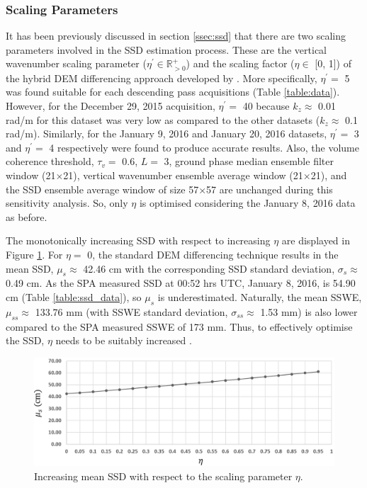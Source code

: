 \documentclass[12pt]{elsarticle}
\numberwithin{equation}{section}
\numberwithin{figure}{section}
\numberwithin{table}{section}
\begin{document}
\subsubsection{Scaling Parameters}
\label{sssec:scale}
It has been previously discussed in section \ref{ssec:ssd} that there are two scaling parameters involved in the SSD estimation process. These are the vertical wavenumber scaling parameter ($\eta^\prime\in\mathbb{R}_{>0}^+$) and the scaling factor ($\eta\in$ [0, 1]) of the hybrid DEM differencing approach developed by \cite{Cloude2010}. More specifically, $\eta^\prime =$ 5 was found suitable for each descending pass acquisitions (Table \ref{table:data}). However, for the December 29, 2015 acquisition, $\eta^\prime =$ 40 because $k_z \approx$ 0.01 rad/m for this dataset was very low as compared to the other datasets ($k_z \approx$ 0.1 rad/m). Similarly, for the January 9, 2016 and January 20, 2016 datasets, $\eta^\prime =$ 3 and $\eta^\prime =$ 4 respectively were found to produce accurate results. Also, the volume coherence threshold, $\tau_v = $ 0.6, $L =$ 3, ground phase median ensemble filter window (21$\times$21), vertical wavenumber ensemble average window (21$\times$21), and the SSD ensemble average window of size 57$\times$57 are unchanged during this sensitivity analysis. So, only $\eta$ is optimised considering the January 8, 2016 data as before.

The monotonically increasing SSD with respect to increasing $\eta$ are displayed in Figure \ref{fig:eta}. For $\eta =$ 0, the standard DEM differencing technique \citep{Cloude2005} results in the mean SSD, $\mu_s \approx$ 42.46 cm with the corresponding SSD standard deviation, $\sigma_s \approx$ 0.49 cm. As the SPA measured SSD at 00:52 hrs UTC, January 8, 2016, is 54.90 cm (Table \ref{table:ssd_data}), so $\mu_s$ is underestimated. Naturally, the mean SSWE, $\mu_{ss} \approx$ 133.76 mm (with SSWE standard deviation, $\sigma_{ss} \approx$ 1.53 mm) is also lower compared to the SPA measured SSWE of 173 mm. Thus, to effectively optimise the SSD, $\eta$ needs to be suitably increased \citep{Cloude2005, Cloude2010}.

\begin{figure}[htb]
    \centering
    \includegraphics[width=\textwidth]{Figures/Results/Eta.png}
    \caption{Increasing mean SSD with respect to the scaling parameter $\eta$.}
    \label{fig:eta}
\end{figure}
\end{document}
